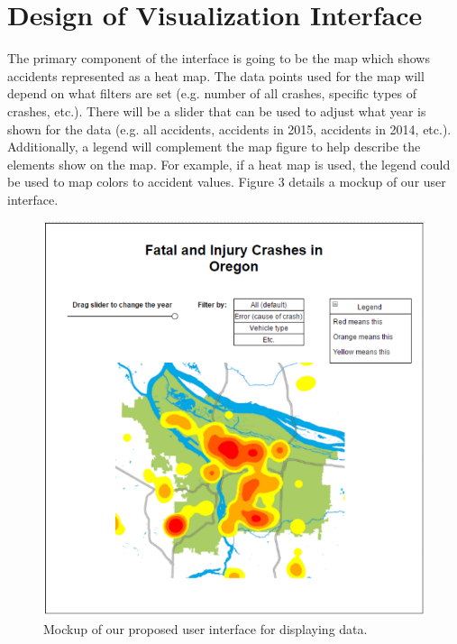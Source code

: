 \documentclass[journal]{vgtc}                %
\begin{document}
\section{Design of Visualization Interface}

The primary component of the interface is going to be the map which shows accidents represented as a heat map. 
The data points used for the map will depend on what filters are set (e.g. number of all crashes, specific types of crashes, etc.).
There will be a slider that can be used to adjust what year is shown for the data (e.g. all accidents, accidents in 2015, accidents in 2014, etc.). 
Additionally, a legend will complement the map figure to help describe the elements show on the map. 
For example, if a heat map is used, the legend could be used to map colors to accident values.
Figure 3 details a mockup of our user interface. 

\begin{figure}[tb]
  \centering %
  \includegraphics[width=\columnwidth]{interface}
  \caption{Mockup of our proposed user interface for displaying data.}
  \label{fig:sample}
\end{figure}


%

%
%
%


\end{document}
